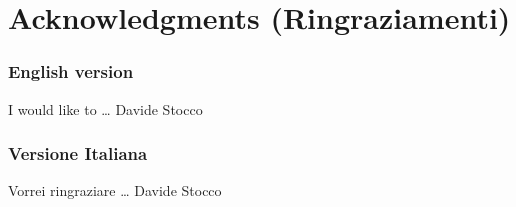 
\chapter*{Acknowledgments (Ringraziamenti)}
\label{chapter:acknowledgements}


\subsection*{English version}

I would like to \dots
\bigskip
\hfill{Davide Stocco}

\subsection*{Versione Italiana}

Vorrei ringraziare \dots
\bigskip
\hfill{Davide Stocco}

\vfill
